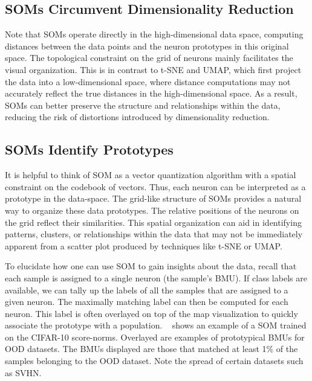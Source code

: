 \subsection*{SOMs Circumvent Dimensionality Reduction}

Note that SOMs operate directly in the high-dimensional data space, computing distances between the data points and the neuron prototypes in this original space. The topological constraint on the grid of neurons mainly facilitates the visual organization. This is in contrast to t-SNE and UMAP, which first project the data into a low-dimensional space, where distance computations may not accurately reflect the true distances in the high-dimensional space. As a result, SOMs can better preserve the structure and relationships within the data, reducing the risk of distortions introduced by dimensionality reduction.

\subsection*{SOMs Identify Prototypes}
It is helpful to think of SOM as a vector quantization algorithm with a spatial constraint on the codebook of vectors. Thus, each neuron can be interpreted as a prototype in the data-space. The grid-like structure of SOMs provides a natural way to organize these data prototypes. The relative positions of the neurons on the grid reflect their similarities. This spatial organization can aid in identifying patterns, clusters, or relationships within the data that may not be immediately apparent from a scatter plot produced by techniques like t-SNE or UMAP.

To elucidate how one can use SOM to gain insights about the data, recall that each sample is assigned to a single neuron (the sample's BMU). If class labels are available, we can tally up the labels of all the samples that are assigned to a given neuron. The maximally matching label can then be computed for each neuron. This label is often overlayed on top of the map visualization to quickly associate the prototype with a population. ~ shows an example of a SOM trained on the CIFAR-10 score-norms. Overlayed are examples of prototypical BMUs for OOD datasets. The BMUs displayed are those that matched at least 1\% of the samples belonging to the OOD dataset. Note the spread of certain datasets such as SVHN.

